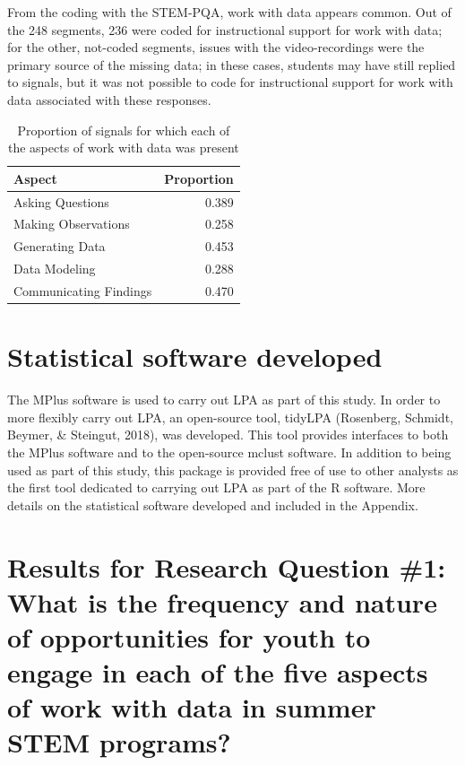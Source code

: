 \documentclass[]{msu-thesis}
\theoremstyle{definition}
\theoremstyle{definition}
\theoremstyle{definition}
\theoremstyle{remark}
\begin{document}
From the coding with the STEM-PQA, work with data appears common. Out of
the 248 segments, 236 were coded for instructional support for work with
data; for the other, not-coded segments, issues with the
video-recordings were the primary source of the missing data; in these
cases, students may have still replied to signals, but it was not
possible to code for instructional support for work with data associated
with these responses.

\begin{table}

\caption{\label{tab:unnamed-chunk-11}Proportion of signals for which each of the aspects of work with data was present}
\centering
\begin{tabular}[t]{lr}
\toprule
Aspect & Proportion\\
\midrule
Asking Questions & 0.389\\
Making Observations & 0.258\\
Generating Data & 0.453\\
Data Modeling & 0.288\\
Communicating Findings & 0.470\\
\bottomrule
\end{tabular}
\end{table}

\section{Statistical software
developed}\label{statistical-software-developed}

The MPlus software is used to carry out LPA as part of this study. In
order to more flexibly carry out LPA, an open-source tool, tidyLPA
(Rosenberg, Schmidt, Beymer, \& Steingut, 2018), was developed. This
tool provides interfaces to both the MPlus software and to the
open-source mclust software. In addition to being used as part of this
study, this package is provided free of use to other analysts as the
first tool dedicated to carrying out LPA as part of the R software. More
details on the statistical software developed and included in the
Appendix.

\section{Results for Research Question \#1: What is the frequency and
nature of opportunities for youth to engage in each of the five aspects
of work with data in summer STEM
programs?}\label{results-for-research-question-1-what-is-the-frequency-and-nature-of-opportunities-for-youth-to-engage-in-each-of-the-five-aspects-of-work-with-data-in-summer-stem-programs}
\end{document}
